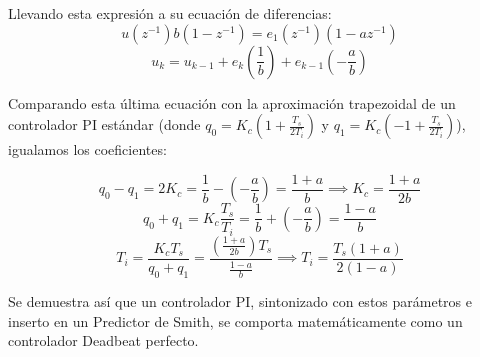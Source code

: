 Llevando esta expresión a su ecuación de diferencias:
\[
  u(z^{-1})b(1 - z^{-1}) = e_1(z^{-1})(1 - az^{-1})
\]
\[
  u_k = u_{k-1} + e_k \left( \frac{1}{b} \right) + e_{k-1} \left( -\frac{a}{b} \right)
\]

Comparando esta última ecuación con la aproximación trapezoidal de un controlador PI estándar (donde $q_0 = K_c(1 + \frac{T_s}{2T_i})$ y $q_1 = K_c(-1 + \frac{T_s}{2T_i})$), igualamos los coeficientes:

\[
  q_0 - q_1 = 2K_c = \frac{1}{b} - \left(-\frac{a}{b}\right) = \frac{1+a}{b} \implies K_c = \frac{1+a}{2b}
\]
\[
  q_0 + q_1 = K_c\frac{T_s}{T_i} = \frac{1}{b} + \left(-\frac{a}{b}\right) = \frac{1-a}{b}
\]
\[
  T_i = \frac{K_c T_s}{q_0 + q_1} = \frac{ \left( \frac{1+a}{2b} \right) T_s }{ \frac{1-a}{b} } \implies T_i = \frac{T_s(1+a)}{2(1-a)}
\]

Se demuestra así que un controlador PI, sintonizado con estos parámetros e inserto en un Predictor de Smith, se comporta matemáticamente como un controlador Deadbeat perfecto.


